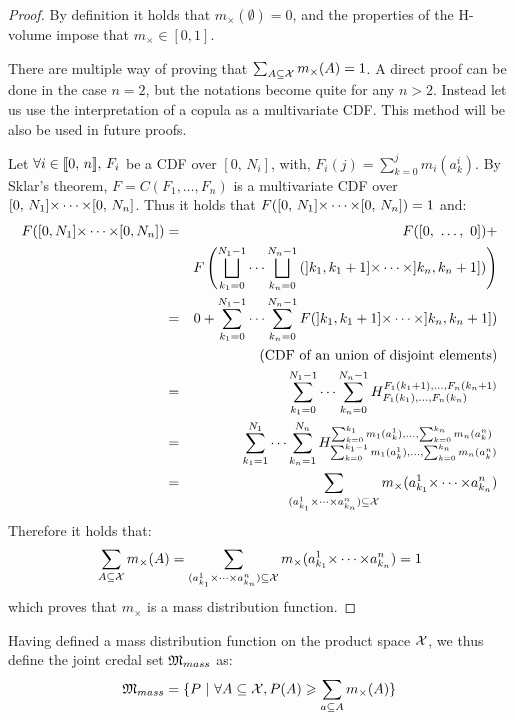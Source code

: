 \begin{proof}
    By definition it holds that $m_\times(\emptyset)=0$, and the properties of the H-volume impose that $m_\times\in[0,1]$.
    
    There are multiple way of proving that $\sum_{A\subseteq{\mathcal{X}}}m_\times(A)=1$. A direct proof can be done in the case $n=2$, but the notations become quite for any $n>2$. Instead let us use the interpretation of a copula as a multivariate CDF. This method will be also be used in future proofs.
    
    Let $\forall i\in{[\![} 0,\, n{]\!]},\, F_i$ be a CDF over $[0,\, N_i]$, with, $F_i(j)=\sum_{k=0}^j m_i(a_k^i)$. By Sklar's theorem, $F=C(F_1,\dots, F_n)$ is a multivariate CDF over $[0,\, N_1]{\times\dots\times}[0,\, N_n]$. Thus it holds that $F([0,\, N_1]{\times\dots\times}[0,\, N_n])=1$ and:
    \begin{eqnarray*}
        F([0, N_1]{\times\dots\times}[0, N_n]) &=& F([0, ~\dots, ~0])+\\
        &&F\left(\bigsqcup_{k_1=0}^{N_1-1}\dots\bigsqcup_{k_n=0}^{N_n-1}\left(]k_1, k_1+1]{\times\dots\times}]k_n, k_n+1]\right)\right)\\
        &=& 0 + \sum_{k_1=0}^{N_1-1}\dots\sum_{k_n=0}^{N_n-1} F(]k_1, k_1+1]{\times\dots\times}]k_n, k_n+1])\\
        && \text{(CDF of an union of disjoint elements)}\\
        &=& \sum_{k_1=0}^{N_1-1}\dots\sum_{k_n=0}^{N_n-1} H_{F_1(k_1), \dots, F_n(k_n)}^{F_1(k_1+1), \dots, F_n(k_n+1)}\\
        &=& \sum_{k_1=1}^{N_1}\dots\sum_{k_n=1}^{N_n} H_{\sum_{k=0}^{k_1-1}m_1(a^1_k), \dots, \sum_{k=0}^{k_n}m_n(a^n_k)}^{\sum_{k=0}^{k_1}m_1(a^1_k), \dots, \sum_{k=0}^{k_n}m_n(a^n_k)}\\
        &=& \sum_{(a^1_{k_1}{\times\dots\times} a^n_{k_n})\subseteq{\mathcal{X}}}m_\times(a^1_{k_1}{\times\dots\times} a^n_{k_n})
    \end{eqnarray*}
Therefore it holds that:
\begin{eqnarray}
    \sum_{A\subseteq{\mathcal{X}}}m_\times(A)=\sum_{(a^1_{k_1}{\times\dots\times} a^n_{k_n})\subseteq{\mathcal{X}}}m_\times(a^1_{k_1}{\times\dots\times} a^n_{k_n})=1
\end{eqnarray}
which proves that $m_\times$ is a mass distribution function.
\end{proof}

Having defined a mass distribution function on the product space ${\mathcal{X}}$, we thus define the joint credal set ${\mathfrak{M}}_{mass}$ as: 
\begin{eqnarray}\label{eq:credal_set_mass}
    {\mathfrak{M}}_{mass} = \{P~|~\forall A\subseteq{\mathcal{X}}, P(A)\geqslant \sum_{a\subseteq A}m_\times(A)\}
\end{eqnarray}

